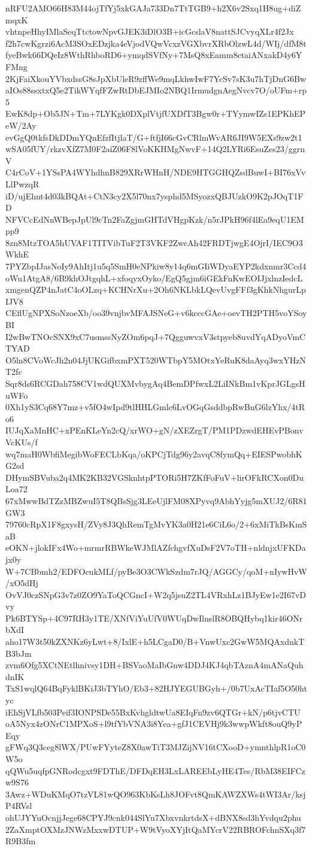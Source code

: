 nRFU2AMO66H83M44ojTfYj5xkGAJa733Dn7TtTGB9+h2X6v2Sxq1H8ug+diZmqxK
vhtnpeHhyIMlaSeqTtctowNpvGJEK3iDlO3B+icGcslaV8nattSJCvyqXLr4f2Jx
f2h7cwKgrzi6AcM3SOxEDzjka4eVjodVQwVcxzVGXbvrXRbOlzwL4d/WIj/dfM8t
fyeBwk66DQeIz8WthRhboRD6+ymqdSVfNy+7MsQ8xEamm8ctaiANxakD4y6YFMng
2KjFaiXkouYVbxdssG8sJpXbUleR9zffWe9mqLkhwIwF7YcSv7sK3u7hTjDnG6Bw
aIOs88ssxtxQ5e2TikWYqfFZwRtDbEJMIo2NBQ1IrmudgnAegNvcv7O/oUFm+rp5
EwK8dp+Ob5JN+Tm+7LYKgk0DXplVtjfUXDfT3Bgw0r+TYymwIZs1EPKhEPeW/2Ay
evGgQ0tkfsDkDDmYQnEfzfItjlaT/G+ftfjI66cGvCRlmWvAR6JI9W5EXs9zw2t1
wSA05fUY/rkzvXfZ7M0F2aiZ06F8lVoKKHMgNwvF+14Q2LYRi6EsuZes23/ggrnV
C4rCoV+1YSsPA4WYhdhnB829XRrWHnH/NDE9HTGGHQZsdBuwI+BI76xVvLlPwzqR
iD/ujEhnt4d03kBQAt+CtN3cy2X5l70nx7ysphd5MSyozxQBJUzkO9K2pJOqT1FD
NFVCcEdNnWBepJpUl9cTn2FaZgjmGHTdVHgpKzk/n5rJPkH96f4lEa9eqU1EMpp9
8zn8MtzTOA5hUVAF1TITVibTuF2T3VKF2ZwcAh42FRDTjwgE4OjrI/IEC9O3WkhE
7PYZbpIJasNoIy9AhItj1u5q5SmH0eNPkiw8y14q6mGIiWDyaEYP2kdxnmr3Ccd4
oWu1AtgA8/6B9khOJtgqhL+xfoqyxOyko/EgQ5gjm6iGEkFnKwEOIJjxlnzIedcL
xmgenQZP4nJatC4oOLzq+KCHNrXu+2Oh6NKLbkLQevUvgFFf3gKhkNhgurLpIJV8
CEflUgNPXSoNzoeXb/oo39vnjbvMFAJSNeG+v6kcccGAe+oevTH2PTH5voYSoyBI
I2wBwTNOcSNX9xC7usmssNyZOm6pqJ+7QgguwvxV3stpyeb8uvdYqADyoVmCTYAD
O5ln8CVoWcJh2n04JjUKGifbxmPXT520WTbpY5MOtxYeRuK8daAyq3wxYHzNT2fc
Sqr8ds6RCGDah758CV1wdQUXMvbygAq4BemDPfwxL2LiINkBm1vKprJGLgsHuWFo
0Xh1yS3Cq68Y7mz+v5fO4wIpd9tlHHLGmlc6LvOGqGsddbpRwBnG6lzYhx/4tRo6
IUJqXaMnHC+xPEnKLeYn2cQ/xrWO+gN/zXEZrgT/PM1PDzwdEHEvPBonvVcKUs/f
wq7maH0WbfiMegibWoFECLbKqa/oKPCjTdg96y2avqC8fymQq+EIESPwobhKG2sd
DHymSBVuba2q4MK2KB32VGSknhtpPTORi5H7ZKfFoFuV+lirOFkRCXon0DuLoa72
67xMwwBdTZzMBZwuI5T8QBsSjg3LEeUjlFM08XPyvq9AbhYyjg5mXUJ2/6R81GW3
79760cRpX1F8gxysH/ZVy8J3QhRemTgMvYK3a0H21e6CiL6o/2+6xMiTkBsKmSaB
eOKN+jlokIFx4Wo+mrmrRBWkeWJMlAZfchgvfXuDsF2V7oTH+nldnjxUFKDajx0y
W+7CBbmh2/EDFOcukMLf/pyBe3O3CWkSzdm7rJQ/AGGCy/qoM+nIywHvW/xO5dHj
OvVJ0czSNpG3v7z0ZO9YaToQCGncI+W2q5jsuZ2TL4VRxhLz1BJyEw1e2I67vDvy
Pk6BTYSp+4C97RH3y1TE/XNfViYuUfV0WUqDwIlnslR8OBQHybq1kir46ONrbXdI
aho17W3t50kZXNKz6yLwt+8/IxlE+h5LCgaD0/B+VnwUxc2GwW5MQAxdnkTB3bJm
zvm6Ofg5XCtNEtlhnivsy1DH+BSVaoMaIbGnw4DDJ4KJ4qbTAznA4mANaQuhdnIK
TxS1wqlQ64BqFyklBKiJ3bTYhO/Eb3+82HJYEGUBGyh+/0b7UxAcTIaf5O50htyc
iEhSjVLfb503Peif3IONPSDe55BxKvhgldtwUa8EIqFn9zv6QTGr+kN/p6tjvCTU
oA5Nyx4zONrC1MPXoS+l9tfYbVNA3i8Yea+gfJ1CEVHj9k3wwpWkft8ouQ9yPEqy
gFWq3Q3ceg8lWX/PUwFYyteZ8X0awTiT3MJZijNV16tCXooD+ymnthlpR1oC0W5o
qQWu5uqfpGNRodcgxt9FDThE/DFDqEH3LxLAREEbLyHE4Tes/RbM38EIFCzw9S76
3Awz+WDuKMqO7tzVL81wQO963KbKsLh8JOFvt8QmKAWZXWs4tWI3Ar/ksjP4RVsl
ohUJYYuOcnjjJege68CPYJ9cnk044SlYu7XbxvnkrtdsX+dBNX8sd3hYvdqu2phu
2ZaXmptOXMzJNWzMxxwDTUP+W9tVyoXYjItQaMYcrV22RBROFchnSXq3f7R9B3fm
